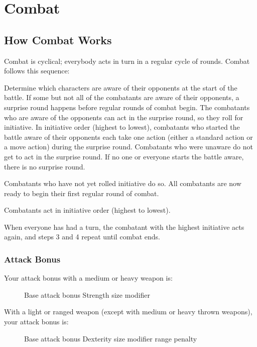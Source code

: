 \chapter{Combat}\label{Combat}

\section{How Combat Works}
Combat is cyclical; everybody acts in turn in a regular cycle of rounds. Combat follows this sequence:
\begin{enumerate*}
\item Determine which characters are aware of their opponents at the start of the battle. If some but not all of the combatants are aware of their opponents, a surprise round happens before regular rounds of combat begin. The combatants who are aware of the opponents can act in the surprise round, so they roll for initiative. In initiative order (highest to lowest), combatants who started the battle aware of their opponents each take one action (either a standard action or a move action) during the surprise round. Combatants who were unaware do not get to act in the surprise round. If no one or everyone starts the battle aware, there is no surprise round.
\item Combatants who have not yet rolled initiative do so. All combatants are now ready to begin their first regular round of combat.
\item Combatants act in initiative order (highest to lowest).
\item When everyone has had a turn, the combatant with the highest initiative acts again, and steps 3 and 4 repeat until combat ends.
\end{enumerate*}

\subsection{Attack Bonus}
Your attack bonus with a medium or heavy weapon is:
\begin{figure}[h]
\centering Base attack bonus \add Strength \add size modifier
\end{figure}

With a light or ranged weapon (except with medium or heavy thrown weapons), your attack bonus is:
\begin{figure}[h]
\centering Base attack bonus \add Dexterity \add size modifier \add range penalty
\end{figure}

